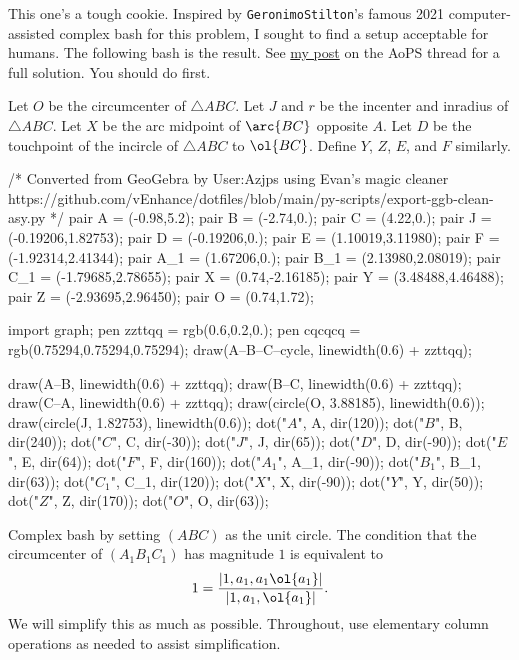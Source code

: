 \documentclass[11pt]{scrartcl}
\begin{document}
\begin{walkthrough}
	This one's a tough cookie. Inspired by \texttt{GeronimoStilton}'s famous 2021 computer-assisted complex bash for this problem, I sought to find a setup acceptable for humans. The following bash is the result. See \href{https://artofproblemsolving.com/community/u987166h1181536p37945622}{my post} on the AoPS thread for a full solution. You should do  first.

	Let $O$ be the circumcenter of $\triangle ABC$. Let $J$ and $r$ be the incenter and inradius of $\triangle ABC$. Let $X$ be the arc midpoint of $\arc{BC}$ opposite $A$. Let $D$ be the touchpoint of the incircle of $\triangle ABC$ to $\ol{BC}$. Define $Y$, $Z$, $E$, and $F$ similarly.

	\begin{center}
		\begin{asy}
		/*
		Converted from GeoGebra by User:Azjps using Evan's magic cleaner
		https://github.com/vEnhance/dotfiles/blob/main/py-scripts/export-ggb-clean-asy.py
		*/
		pair A = (-0.98,5.2);
		pair B = (-2.74,0.);
		pair C = (4.22,0.);
		pair J = (-0.19206,1.82753);
		pair D = (-0.19206,0.);
		pair E = (1.10019,3.11980);
		pair F = (-1.92314,2.41344);
		pair A_1 = (1.67206,0.);
		pair B_1 = (2.13980,2.08019);
		pair C_1 = (-1.79685,2.78655);
		pair X = (0.74,-2.16185);
		pair Y = (3.48488,4.46488);
		pair Z = (-2.93695,2.96450);
		pair O = (0.74,1.72);

		import graph;
		pen zzttqq = rgb(0.6,0.2,0.);
		pen cqcqcq = rgb(0.75294,0.75294,0.75294);
		draw(A--B--C--cycle, linewidth(0.6) + zzttqq);

		draw(A--B, linewidth(0.6) + zzttqq);
		draw(B--C, linewidth(0.6) + zzttqq);
		draw(C--A, linewidth(0.6) + zzttqq);
		draw(circle(O, 3.88185), linewidth(0.6));
		draw(circle(J, 1.82753), linewidth(0.6));
		dot("$A$", A, dir(120));
		dot("$B$", B, dir(240));
		dot("$C$", C, dir(-30));
		dot("$J$", J, dir(65));
		dot("$D$", D, dir(-90));
		dot("$E$", E, dir(64));
		dot("$F$", F, dir(160));
		dot("$A_1$", A_1, dir(-90));
		dot("$B_1$", B_1, dir(63));
		dot("$C_1$", C_1, dir(120));
		dot("$X$", X, dir(-90));
		dot("$Y$", Y, dir(50));
		dot("$Z$", Z, dir(170));
		dot("$O$", O, dir(63));
		\end{asy}
	\end{center}

	Complex bash by setting $(ABC)$ as the unit circle. The condition that the circumcenter of $(A_1B_1C_1)$ has magnitude $1$ is equivalent to
	\[1 = \frac{\lvert 1,a_1,a_1\ol{a_1}\rvert}{\lvert 1,a_1,\ol{a_1}\rvert}.\]
	We will simplify this as much as possible. Throughout, use elementary column operations as needed to assist simplification.


\end{walkthrough}
\end{document}
